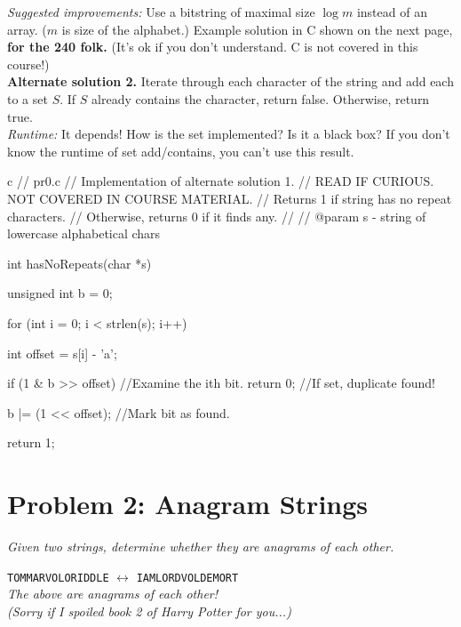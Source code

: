 \textit{Suggested improvements:} Use a bitstring of maximal size $\log m$ instead of an array. ($m$ is size of the alphabet.) Example solution in C shown on the next page, \textbf{for the 240 folk.} (It's ok if you don't understand. C is not covered in this course!)\\

\textbf{Alternate solution 2.} Iterate through each character of the string and add each to a set $S$. If $S$ already contains the character, return false. Otherwise, return true.\\

\textit{Runtime:} It depends! How is the set implemented? Is it a black box? If you don't know the runtime of set add/contains, you can't use this result.\\

\begin{code}{c}
    // pr0.c
    // Implementation of alternate solution 1.
    // READ IF CURIOUS. NOT COVERED IN COURSE MATERIAL.
    // Returns 1 if string has no repeat characters.
    // Otherwise, returns 0 if it finds any.
    // 
    // @param s - string of lowercase alphabetical chars

    int hasNoRepeats(char *s) {
        unsigned int b = 0;

        for (int i = 0; i < strlen(s); i++) {
            int offset = s[i] - 'a';

            if (1 & b >> offset) {  //Examine the ith bit.
                return 0;           //If set, duplicate found!
            }

            b |= (1 << offset);     //Mark bit as found.
        }

        return 1;
    }
\end{code}

\section*{Problem 2: Anagram Strings}

\textit{Given two strings, determine whether they are anagrams of each other.}

\begin{center}
    \texttt{TOMMARVOLORIDDLE} $\longleftrightarrow$ \texttt{IAMLORDVOLDEMORT}\\

    \textit{The above are anagrams of each other!\\ (Sorry if I spoiled book 2 of Harry Potter for you...)}
\end{center}

